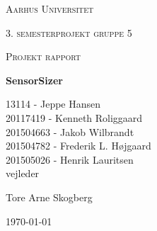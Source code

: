 \thispagestyle{empty}
	{\centering
	{\scshape\LARGE Aarhus Universitet \par}
	\vspace{1cm}
	{\scshape\Large 3. semesterprojekt gruppe 5\par}
	{\scshape\Large Projekt rapport\par}
	\vspace{1.5cm}
	{\huge\bfseries SensorSizer\par}
	\vspace{2cm}
	{\Large
	13114 - Jeppe Hansen\\ 
	20117419 - Kenneth Roliggaard\\
	201504663 - Jakob Wilbrandt\\ 
	201504782 - Frederik L. Højgaard\\ 
	201505026 - Henrik Lauritsen\\ }
	\vfill
	vejleder\par
	Tore Arne Skogberg

	\vfill

	{\large \today\par}
\par}

